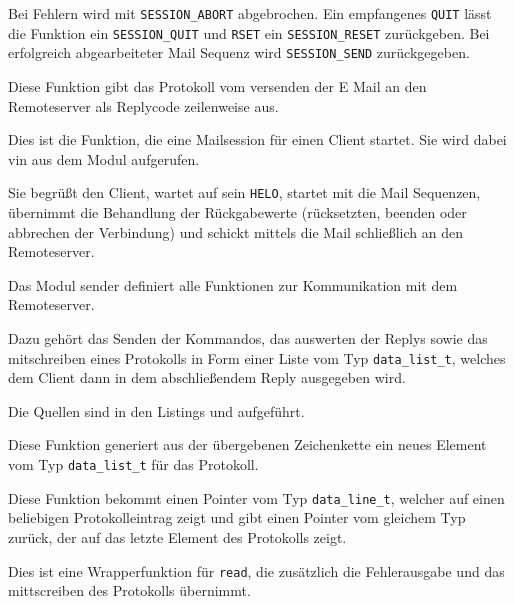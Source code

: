 Bei Fehlern wird mit \texttt{SESSION\_ABORT} abgebrochen. Ein empfangenes \texttt{QUIT} l\"{a}sst die Funktion ein \texttt{SESSION\_QUIT} und \texttt{RSET} ein \texttt{SESSION\_RESET} zur\"{u}ckgeben. Bei erfolgreich abgearbeiteter Mail Sequenz wird \texttt{SESSION\_SEND} zur\"{u}ckgegeben.

\label{fn:put_forward_proto}
Diese Funktion gibt das Protokoll vom versenden der E Mail an den Remoteserver als Replycode zeilenweise aus.


\label{fn:start_session}
Dies ist die Funktion, die eine Mailsession f\"{u}r einen Client startet. Sie wird dabei vin  aus dem Modul  aufgerufen.

Sie begr\"{u}ßt den Client, wartet auf sein \texttt{HELO}, startet mit  die Mail Sequenzen, \"{u}bernimmt die Behandlung der R\"{u}ckgabewerte (r\"{u}cksetzten, beenden oder abbrechen der Verbindung) und schickt mittels  die Mail schließlich an den Remoteserver.



\label{mod:sender}
Das Modul sender definiert alle Funktionen zur Kommunikation mit dem Remoteserver.

Dazu geh\"{o}rt das Senden der Kommandos, das auswerten der Replys sowie das mitschreiben eines Protokolls in Form einer Liste vom Typ \texttt{data\_list\_t}, welches dem Client dann in dem abschließendem Reply ausgegeben wird.

Die Quellen sind in den Listings  und  aufgef\"{u}hrt.

\label{fn:new_proto_entry}
Diese Funktion generiert aus der \"{u}bergebenen Zeichenkette ein neues Element vom Typ \texttt{data\_list\_t} f\"{u}r das Protokoll.

\label{fn:wind_proto}
Diese Funktion bekommt einen Pointer vom Typ \texttt{data\_line\_t}, welcher auf einen beliebigen Protokolleintrag zeigt und gibt einen Pointer vom gleichem Typ zur\"{u}ck, der auf das letzte Element des Protokolls zeigt.

\label{fn:read_remote}
Dies ist eine Wrapperfunktion f\"{u}r \texttt{read}, die zus\"{a}tzlich die Fehlerausgabe und das mittscreiben des Protokolls \"{u}bernimmt.

